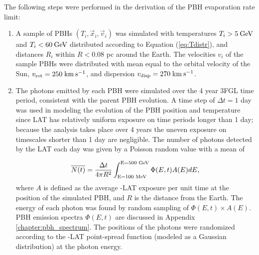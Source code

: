The following steps were performed in the derivation of the PBH evaporation rate limit:
\vspace{-2mm}
\begin{enumerate}
\item
\label{item:make_pbhs}
A sample of PBHs $(T_i, \vec{x}_i, \vec{v}_i)$ was simulated with temperatures $T_i>5\: {\rm GeV}$ and $T_i<60\: {\rm GeV}$ distributed according to Equation (\ref{eq:Tdistr}), and distances $R_i$ within $R < 0.08$ pc around the Earth. 
The velocities $v_i$ of the sample PBHs were distributed with mean equal to the orbital velocity of the Sun, 
$v_{\rm rot} = 250\; {\rm km\: s^{-1}}$,
and dispersion $v_{\rm disp} = 270\; {\rm km\: s^{-1}}$.
\item
The photons emitted by each PBH were simulated over the 4 year 3FGL time period, consistent with the parent PBH evolution.
A time step of $\Delta t = 1$ day was used in modeling the evolution of the PBH position and temperature since \Fermi LAT has relatively uniform exposure on time periods longer than 1 day; because the analysis takes place over 4 years the uneven exposure on timescales shorter than 1 day are negligible.
 The number of photons detected by the \Fermi LAT each day was given by a Poisson random value with a mean of 

\noindent
\begin{equation}
\overline{N(t)} = \frac{ \Delta t}{4\pi R^2}\int_{\textup{E=100 MeV}}^{\textup{E=500 GeV}} {\Phi(E,t)} A(E) dE,
\end{equation}
where $A$ is defined as the average \Fermi-LAT exposure per unit time at the position of the simulated PBH, and $R$ is the distance from the Earth.
The energy of each photon was found by random sampling of $\Phi(E,t)\times A(E)$. 
PBH emission spectra $\Phi(E,t)$ are discussed in Appendix \ref{chapter:pbh_spectrum}. 
The positions of the photons were randomized according to the \Fermi-LAT point-spread function (modeled as a Gaussian distribution) at the photon energy.


\end{enumerate}
